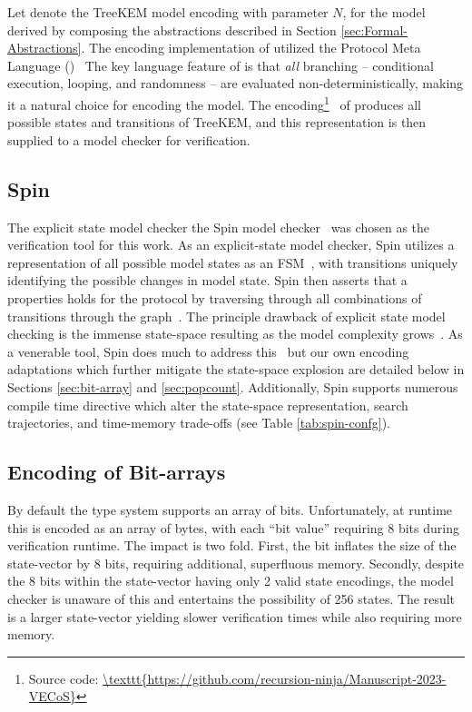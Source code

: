\documentclass[runningheads]{llncs}
\newcommand{\Abrev}[1]{\gls{#1}}
\begin{document}
Let  denote the TreeKEM model encoding with parameter $N$, for the model derived by composing the abstractions described in Section \ref{sec:Formal-Abstractions}.
The encoding implementation of  utilized the Protocol Meta Language (\Promela)~\cite{HolzmannSpinBook2003, holzmann1990design}
The key language feature of \Promela is that \emph{all} branching -- conditional execution, looping, and randomness -- are evaluated non-deterministically, making it a natural choice for encoding the model.
The \Promela encoding\footnote{Source code: \url{\texttt{https://github.com/recursion-ninja/Manuscript-2023-VECoS}}}\ %
of  produces all possible states and transitions of TreeKEM, and this representation is then supplied to a model checker for verification.

\subsection{Spin}

The explicit state model checker the Spin model checker~\cite{HolzmannSpinBook2003} was chosen as the verification tool for this work.
As an explicit-state model checker, Spin utilizes a representation of all possible model states as an \Abrev{FSM}~\cite{clarke1981design}, with transitions uniquely identifying the possible changes in model state.
Spin then asserts that a properties holds for the protocol by traversing through all combinations of transitions through the graph~\cite{Vardi1986}.
The principle drawback of explicit state model checking is the immense state-space resulting as the model complexity grows~\cite{burch1992symbolic}.
As a venerable tool, Spin does much to address this~\cite{rudin1987limits, godefroid1990using, valmari1993fly, peled1994combining, couvreur1999fly} but our own encoding adaptations which further mitigate the state-space explosion are detailed below in Sections \ref{sec:bit-array} and \ref{sec:popcount}.
Additionally, Spin supports numerous compile time directive which alter the state-space representation, search trajectories, and time-memory trade-offs (see Table \ref{tab:spin-confg}).


\subsection{Encoding  of Bit-arrays\label{sec:bit-array}}

By default the \Promela type system supports an array of bits.
Unfortunately, at runtime this is encoded as an array of bytes, with each ``\Promela bit value'' requiring 8 bits during verification runtime.
The impact is two fold.
First, the bit inflates the size of the state-vector by 8 bits, requiring additional, superfluous memory.
Secondly, despite the 8 bits within the state-vector having only 2 valid state encodings, the model checker is unaware of this and entertains the possibility of 256 states.
The result is a larger state-vector yielding slower verification times while also requiring more memory.
\end{document}
